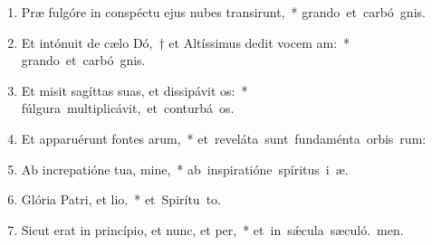 \begin{flushleft}
\begin{enumerate}[leftmargin=*]
\item Præ fulgóre in conspéctu ejus nubes transirunt,~* \mbox{grando et carbó gnis.}

\item Et intónuit de cælo Dó,~† et Altíssimus dedit vocem am:~* \mbox{grando et carbó gnis.}

\item Et misit sagíttas suas, et dissipávit os:~* \mbox{fúlgura multiplicávit, et conturbá os.}

\item Et apparuérunt fontes arum,~* \mbox{et reveláta sunt fundaménta orbis rum:}

\item Ab increpatióne tua, mine,~* \mbox{ab inspiratióne spíritus i æ.}


\item Glória Patri, et lio,~* \mbox{et Spirítu to.}

\item Sicut erat in princípio, et nunc, et per,~* \mbox{et in sǽcula sæculó. men.}

\end{enumerate}
\end{flushleft}

